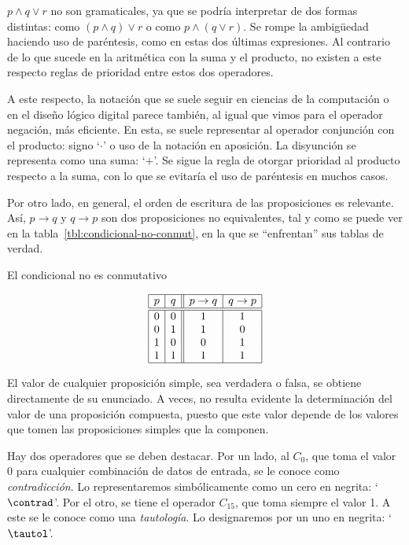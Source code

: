 $p \land q \lor r$ no son gramaticales, ya que se podría interpretar de dos
formas distintas: como $(p \land q) \lor r$ o como $p \land (q \lor r)$. Se
rompe la ambigüedad haciendo uso de paréntesis, como en estas dos últimas
expresiones. Al contrario de lo que sucede en la aritmética con la suma y el
producto, no existen a este respecto reglas de prioridad entre estos dos
operadores.

A este respecto, la notación que se suele seguir en ciencias de la
computación o en el diseño lógico digital parece también, al igual que vimos
para el operador negación, más eficiente. En esta, se suele representar al
operador conjunción con el producto: signo `$\cdot$' o uso de la notación en
aposición. La disyunción se representa como una suma: `$+$'. Se sigue la
regla de otorgar prioridad al producto respecto a la suma, con lo que se
evitaría el uso de paréntesis en muchos casos.

Por otro lado, en general, el orden de escritura de las proposiciones es
relevante. Así, $p \rightarrow q$ y $q \rightarrow p$ son dos proposiciones
no equivalentes, tal y como se puede ver en la
tabla~\ref{tbl:condicional-no-conmut}, en la que se ``enfrentan'' sus tablas
de verdad.

\begin{table}[h]%
  \caption{El condicional no es conmutativo}
  \label{tbl:condicional-no-conmut}%
  \centering
  $$
    \begin{array}{|c|c||c|c|}
      \hline
      p & q & p \rightarrow q & q \rightarrow p \\
      \hline
      \hline
      0 & 0 & 1 & 1 \\
      0 & 1 & 1 & 0 \\
      1 & 0 & 0 & 1 \\
      1 & 1 & 1 & 1 \\
      \hline
    \end{array}
  $$
\end{table}

El valor de cualquier proposición simple, sea verdadera o falsa, se obtiene
directamente de su enunciado. A veces, no resulta evidente la determinación
del valor de una proposición compuesta, puesto que este valor depende de los
valores que tomen las proposiciones simples que la componen.

Hay dos operadores que se deben destacar. Por un lado, al $C_0$, que toma el
valor 0 para cualquier combinación de datos de entrada, se le conoce como
\emph{contradicción}. Lo representaremos simbólicamente como un cero en
negrita: `$\contrad$'. Por el otro, se tiene el operador $C_{15}$, que toma
siempre el valor 1. A este se le conoce como una \emph{tautología}. Lo
designaremos por un uno en negrita: `$\tautol$'.

